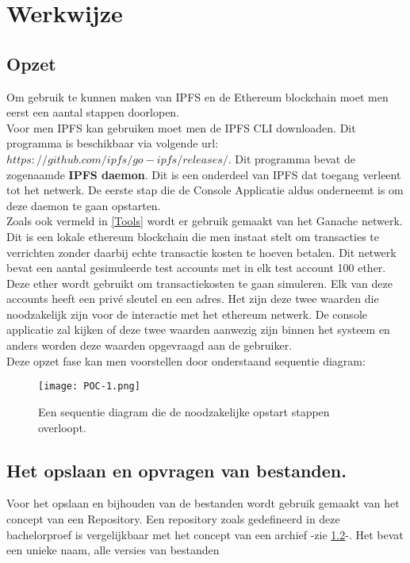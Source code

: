 \section{Werkwijze}
\subsection{Opzet}
Om gebruik te kunnen maken van IPFS en de Ethereum blockchain moet men eerst een aantal stappen doorlopen.\\

Voor men IPFS kan gebruiken moet men de IPFS CLI downloaden. Dit programma is beschikbaar via volgende url: $https://github.com/ipfs/go-ipfs/releases/$. Dit programma bevat de zogenaamde \textbf{IPFS daemon}. Dit is een onderdeel van IPFS dat toegang verleent tot het netwerk. De eerste stap die de Console Applicatie aldus onderneemt is om deze daemon te gaan opstarten.\\

Zoals ook vermeld in \ref{Tools} wordt er gebruik gemaakt van het Ganache netwerk. Dit is een lokale ethereum blockchain die men instaat stelt om transacties te verrichten zonder daarbij echte transactie kosten te hoeven betalen. Dit netwerk bevat een aantal gesimuleerde test accounts met in elk test account 100 ether. Deze ether wordt gebruikt om transactiekosten te gaan simuleren. Elk van deze accounts heeft een privé sleutel en een adres. Het zijn deze twee waarden die noodzakelijk zijn voor de interactie met het ethereum netwerk. De console applicatie zal kijken of deze twee waarden aanwezig zijn binnen het systeem en anders worden deze waarden opgevraagd aan de gebruiker.\\

Deze opzet fase kan men voorstellen door onderstaand sequentie diagram:

\begin{figure}[h!]
\centering
\texttt{[image: POC-1.png]}
\caption[POC opstart]{Een sequentie diagram die de noodzakelijke opstart stappen overloopt. }
\end{figure}

\subsection{Het opslaan en opvragen van bestanden.}
Voor het opslaan en bijhouden van de bestanden wordt gebruik gemaakt van het concept van een Repository. Een repository zoals gedefineerd in deze bachelorproef is vergelijkbaar met het concept van een archief -zie \ref{}-. Het bevat een unieke naam, alle versies van bestanden 

